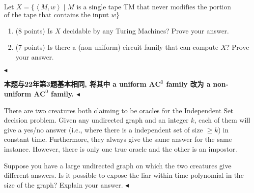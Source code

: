 \documentclass[11pt]{article}
\newenvironment{problem}[2][Question]{\begin{trivlist}
\item[\hskip \labelsep{\bfseries#1}\hskip\labelsep{\bfseries#2.}]}{\hfill$\blacktriangleleft$\end{trivlist}}
\begin{document}
\begin{problem}{2.(15 points)}
    Let $X = \{\left\langle M,w \right\rangle\mid M \text{ is a single tape TM that never modifies the portion} $
    \\$\text{of the tape that contains the input } w\}$

    \begin{enumerate}[label=(\alph*)]
        \item (8 points) Is $X$ decidable by any Turing Machines? Prove your answer.
        \item (7 points) Is there a (non-uniform) circuit family that can compute $X$? Prove your answer.
    \end{enumerate}
\end{problem}

\begin{problem}{3.(15 points)}
    \bf 本题与22年第3题基本相同, 将其中 a uniform $\mathbf{AC}^0$ family 改为 a non-uniform $\mathbf{AC}^0$ family.
\end{problem}
\newpage
\begin{problem}{4.(12 points)}
    There are two creatures both claiming to be oracles for the Independent Set decision problem. Given any undirected graph and an integer $k$, each of them will give a yes/no answer (i.e., where there is a independent set of size $\ge k$) in constant time. Furthermore, they always give the same answer for the same instance. However, there is only one true oracle and the other is an impostor.  

    Suppose you have a large undirected graph on which the two creatures give different answers. Is it possible to expose the liar within time polynomial in the size of the graph? Explain your answer.
\end{problem}
\end{document}
